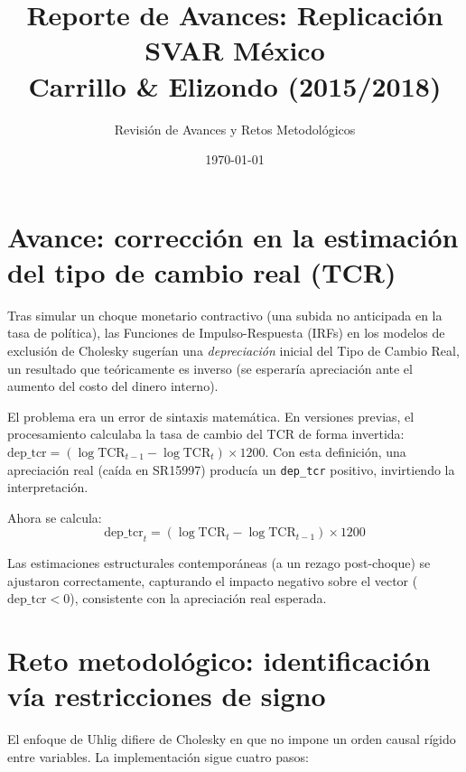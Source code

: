 \documentclass[11pt,a4paper]{article}
\title{\textbf{Reporte de Avances: Replicación SVAR México}\\ \large Carrillo \& Elizondo (2015/2018)}
\author{Revisión de Avances y Retos Metodológicos}
\date{\today}
\begin{document}
\maketitle

\section{Avance: corrección en la estimación del tipo de cambio real (TCR)}
Tras simular un choque monetario contractivo (una subida no anticipada en la tasa de política), las Funciones de Impulso-Respuesta (IRFs) en los modelos de exclusión de Cholesky sugerían una \textit{depreciación} inicial del Tipo de Cambio Real, un resultado que teóricamente es inverso (se esperaría apreciación ante el aumento del costo del dinero interno).

El problema era un error de sintaxis matemática. En versiones previas, el procesamiento calculaba la tasa de cambio del TCR de forma invertida: $\text{dep\_tcr} = (\log\text{TCR}_{t-1} - \log\text{TCR}_t)\times 1200$.
Con esta definición, una apreciación real (caída en SR15997) producía un \texttt{dep\_tcr} positivo, invirtiendo la interpretación.

Ahora se calcula:
$$ \text{dep\_tcr}_t = (\log\text{TCR}_t - \log\text{TCR}_{t-1})\times 1200 $$

Las estimaciones estructurales contemporáneas (a un rezago post-choque) se ajustaron correctamente, capturando el impacto negativo sobre el vector ($\text{dep\_tcr} < 0$), consistente con la apreciación real esperada.

\section{Reto metodológico: identificación vía restricciones de signo}
El enfoque de Uhlig difiere de Cholesky en que no impone un orden causal rígido entre variables. La implementación sigue cuatro pasos:
\end{document}
